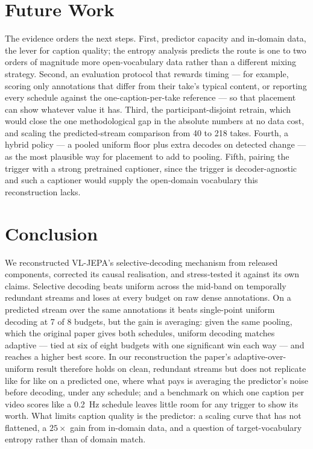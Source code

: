 \documentclass[journal]{IEEEtran}
\begin{document}
\section{Future Work}
The evidence orders the next steps. First, predictor capacity and in-domain data,
the lever for caption quality; the entropy analysis predicts the route is one to
two orders of magnitude more open-vocabulary data rather than a different mixing
strategy. Second, an evaluation protocol that rewards timing --- for example,
scoring only annotations that differ from their take's typical content, or
reporting every schedule against the one-caption-per-take reference --- so that
placement can show whatever value it has. Third, the participant-disjoint retrain,
which would close the one methodological gap in the absolute numbers at no data
cost, and scaling the predicted-stream comparison from 40 to 218 takes. Fourth, a
hybrid policy --- a pooled uniform floor plus extra decodes on detected change ---
as the most plausible way for placement to add to pooling. Fifth, pairing the
trigger with a strong pretrained captioner, since the trigger is decoder-agnostic
and such a captioner would supply the open-domain vocabulary this reconstruction
lacks.

\section{Conclusion}
We reconstructed VL-JEPA's selective-decoding mechanism from released components,
corrected its causal realisation, and stress-tested it against its own claims.
Selective decoding beats uniform across the mid-band on temporally redundant
streams and loses at every budget on raw dense annotations. On a predicted stream
over the same annotations it beats single-point uniform decoding at 7 of 8 budgets,
but the gain is averaging: given the same pooling, which the original paper gives
both schedules, uniform decoding matches adaptive --- tied at six of eight budgets
with one significant win each way --- and reaches a higher best score. In our
reconstruction the paper's adaptive-over-uniform result therefore holds on clean,
redundant streams but does not replicate like for like on a predicted one, where
what pays is averaging the predictor's noise before decoding, under any schedule;
and a benchmark on which one caption per video scores like a 0.2~Hz schedule
leaves little room for any trigger to show its worth. What limits caption quality
is the predictor: a scaling curve that has not flattened, a $25\times$ gain from
in-domain data, and a question of target-vocabulary entropy rather than of domain
match.



\end{document}
